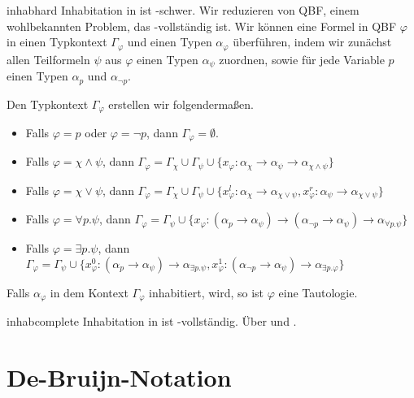 \begin{theorem}{}{inhabhard}
    Inhabitation in \STLC{} ist \PSPACE-schwer.
\Proofidea   
Wir reduzieren von QBF, einem wohlbekannten Problem, das \PSPACE-vollständig ist.
   Wir können eine Formel in QBF $\varphi$ in einen Typkontext $\Gamma_\varphi$ und einen Typen $\alpha_\varphi$ überführen, indem wir zunächst allen Teilformeln $\psi$ aus $\varphi$ einen Typen $\alpha_\psi$ zuordnen, sowie für jede Variable $p$ einen Typen $\alpha_p$ und $\alpha_{\neg p}$. 
   
   Den Typkontext $\Gamma_\varphi$ erstellen wir folgendermaßen.
   \begin{itemize}
    \item Falls $\varphi=p$ oder $\varphi = \neg p$, dann $\Gamma_\varphi = \emptyset$. 
    \item Falls $\varphi=\chi\land\psi$, dann $\Gamma_\varphi = \Gamma_\chi \cup \Gamma_\psi \cup \{x_\varphi: \alpha_\chi\to\alpha_\psi\to\alpha_{\chi\land\psi}\}$
    \item Falls $\varphi=\chi\lor\psi$, dann $\Gamma_\varphi = \Gamma_\chi \cup \Gamma_\psi \cup \{x^l_\varphi: \alpha_\chi\to\alpha_{\chi\lor\psi}, x^r_\varphi: \alpha_\psi\to\alpha_{\chi\lor\psi}\}$
    \item Falls $\varphi=\forall p.\psi$, dann $\Gamma_\varphi = \Gamma_\psi \cup \{x_\varphi: (\alpha_p\to\alpha_\psi)\to(\alpha_{\neg p}\to\alpha_\psi)\to\alpha_{\forall p.\psi}\}$
    \item Falls $\varphi=\exists p.\psi$, dann $\Gamma_\varphi = \Gamma_\psi \cup \{x^0_\varphi: (\alpha_p\to\alpha_\psi)\to\alpha_{\exists p.\psi}, x^1_\varphi:(\alpha_{\neg p}\to\alpha_\psi)\to\alpha_{\exists p.\varphi}\}$
    \end{itemize}
    
    Falls $\alpha_\varphi$ in dem Kontext $\Gamma_\varphi$ inhabitiert, wird, so ist $\varphi$ eine Tautologie\cite{pawel}.
\end{theorem}


\begin{theorem}{}{inhabcomplete}
    Inhabitation in \STLC{} ist \PSPACE-vollständig.
    \Proof
    Über  und .
\end{theorem}


\section{De-Bruijn-Notation}

